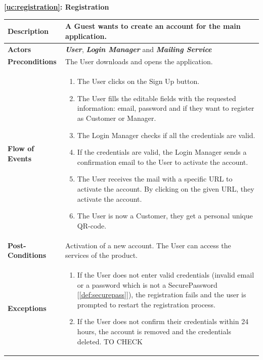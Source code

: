 \documentclass[a4paper, 10pt, oneside]{article}
\newcommand*{\lorenzo}[1]{\textcolor{BurntOrange}{#1}}
\begin{document}
\begin{center}
{\textbf{\ref{uc:registration}: Registration}}
\end{center}
\begin{tabularx}{\linewidth}{| l | X |}
	
	\hline
	\textbf{Description} & A Guest wants to create an account for the main application.\\
	

	\hline
	\textbf{Actors} & \textbf{\textit{User}}, \textbf{\textit{Login Manager}} and \textbf{\textit{Mailing Service}}\\
	
	\hline
	\textbf{Preconditions} & The User downloads and opens the application.\\
	
	\hline
	\textbf{Flow of Events} & \parbox{0.7\textwidth}{	
		\begin{enumerate}
			\item The User clicks on the Sign Up button.
			\item The User fills the editable fields with the requested information: email, password and if they want to register as Customer or Manager.
			\item The Login Manager checks if all the credentials are valid.
			\item If the credentials are valid, the Login Manager sends a confirmation email to the User to activate the account.
			\item The User receives the mail with a specific URL to activate the account. By clicking on the given URL, they activate the account.
			\item The User is now a Customer, they get a personal unique QR-code.
	\end{enumerate}}\\
	
	\hline
	\textbf{Post-Conditions} & Activation of a new account. The User can access the services of the product.\\
	
	\hline
	\textbf{Exceptions} & \parbox{0.7\textwidth}{ \begin{enumerate}
			\item If the User does not enter valid credentials (invalid email or a password which is not a SecurePassword [\ref{def:securepass}]), the registration fails and the user is prompted to restart the registration process.
			\item If the User does not confirm their credentials within 24 hours, the account is removed and the credentials deleted. \lorenzo{TO CHECK}
		\end{enumerate}}\\

	\hline
	
\end{tabularx}
\end{document}
